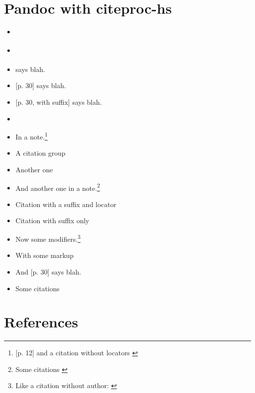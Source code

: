 \section{Pandoc with citeproc-hs}\hypertarget{pandoc-with-citeproc-hs}{}\label{pandoc-with-citeproc-hs}

\begin{itemize}
\item \citetext{\citet{nonexistent}}
\item \citet{nonexistent}
\item \citet{item1} says blah.
\item \citet{item1} [p. 30] says blah.
\item \citet{item1} [p. 30, with suffix] says blah.
\item \citet{item1} \citetext{\citeyear{item2} p. 30,  see also \citet{пункт3}}
\item In a note.\footnote{\citet{пункт3} [p. 12] and a citation without locators \citetext{\citet{пункт3}}}
\item A citation group \citetext{see \citet{item1} chap. 3,  also \citet{пункт3} p. 34-35}
\item Another one \citetext{see \citet{item1} p. 34-35}
\item And another one in a note.\footnote{Some citations \citetext{see \citet{item1} chap. 3,  \citet{пункт3},  \citet{item2}}}
\item Citation with a suffix and locator \citetext{\citet{item1} pp. 33, 35-37, and nowhere else}
\item Citation with suffix only \citetext{\citet{item1} and nowhere else}
\item Now some modifiers.\footnote{Like a citation without author: \citetext{\citeyear{item1}}}
\item With some markup \citetext{\emph{see} \citet{item1} p. \textbf{32}}
\item And \citeyear{item1} [p. 30] says blah.
\item Some citations \citetext{see \citet{item1} chap. 3,  \citet{пункт3},  \citet{item2}}
\end{itemize}

\section{References}\hypertarget{references}{}\label{references}

